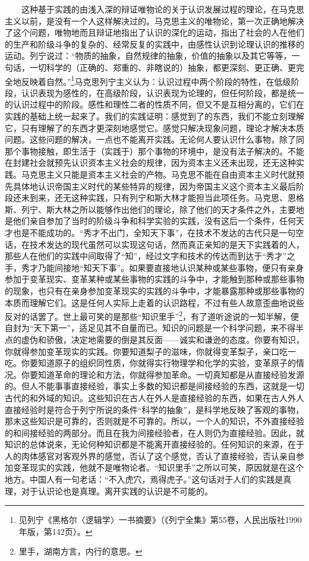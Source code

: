 \documentclass[cn,11pt,chinese]{elegantbook}
\begin{document}
　　这种基于实践的由浅入深的辩证唯物论的关于认识发展过程的理论，在马克思主义以前，是没有一个人这样解决过的。马克思主义的唯物论，第一次正确地解决了这个问题，唯物地而且辩证地指出了认识的深化的运动，指出了社会的人在他们的生产和阶级斗争的复杂的、经常反复的实践中，由感性认识到论理认识的推移的运动。列宁说过：“物质的抽象，自然规律的抽象，价值的抽象以及其它等等，一句话，一切科学的（正确的、郑重的、非瞎说的）抽象，都更深刻、更正确、更完全地反映着自然。”\footnote[3]{ 见列宁《黑格尔〈逻辑学〉一书摘要》（《列宁全集》第55卷，人民出版社1990年版，第142页）。}马克思列宁主义认为：认识过程中两个阶段的特性，在低级阶段，认识表现为感性的，在高级阶段，认识表现为论理的，但任何阶段，都是统一的认识过程中的阶段。感性和理性二者的性质不同，但又不是互相分离的，它们在实践的基础上统一起来了。我们的实践证明：感觉到了的东西，我们不能立刻理解它，只有理解了的东西才更深刻地感觉它。感觉只解决现象问题，理论才解决本质问题。这些问题的解决，一点也不能离开实践。无论何人要认识什么事物，除了同那个事物接触，即生活于（实践于）那个事物的环境中，是没有法子解决的。不能在封建社会就预先认识资本主义社会的规律，因为资本主义还未出现，还无这种实践。马克思主义只能是资本主义社会的产物。马克思不能在自由资本主义时代就预先具体地认识帝国主义时代的某些特异的规律，因为帝国主义这个资本主义最后阶段还未到来，还无这种实践，只有列宁和斯大林才能担当此项任务。马克思、恩格斯、列宁、斯大林之所以能够作出他们的理论，除了他们的天才条件之外，主要地是他们亲自参加了当时的阶级斗争和科学实验的实践，没有这后一个条件，任何天才也是不能成功的。“秀才不出门，全知天下事”，在技术不发达的古代只是一句空话，在技术发达的现代虽然可以实现这句话，然而真正亲知的是天下实践着的人，那些人在他们的实践中间取得了“知”，经过文字和技术的传达而到达于“秀才”之手，秀才乃能间接地“知天下事”。如果要直接地认识某种或某些事物，便只有亲身参加于变革现实、变革某种或某些事物的实践的斗争中，才能触到那种或那些事物的现象，也只有在亲身参加变革现实的实践的斗争中，才能暴露那种或那些事物的本质而理解它们。这是任何人实际上走着的认识路程，不过有些人故意歪曲地说些反对的话罢了。世上最可笑的是那些“知识里手”\footnote[4]{ 里手，湖南方言，内行的意思。}，有了道听途说的一知半解，便自封为“天下第一”，适足见其不自量而已。知识的问题是一个科学问题，来不得半点的虚伪和骄傲，决定地需要的倒是其反面——诚实和谦逊的态度。你要有知识，你就得参加变革现实的实践。你要知道梨子的滋味，你就得变革梨子，亲口吃一吃。你要知道原子的组织同性质，你就得实行物理学和化学的实验，变革原子的情况。你要知道革命的理论和方法，你就得参加革命。一切真知都是从直接经验发源的。但人不能事事直接经验，事实上多数的知识都是间接经验的东西，这就是一切古代的和外域的知识。这些知识在古人在外人是直接经验的东西，如果在古人外人直接经验时是符合于列宁所说的条件“科学的抽象”，是科学地反映了客观的事物，那末这些知识是可靠的，否则就是不可靠的。所以，一个人的知识，不外直接经验的和间接经验的两部分。而且在我为间接经验者，在人则仍为直接经验。因此，就知识的总体说来，无论何种知识都是不能离开直接经验的。任何知识的来源，在于人的肉体感官对客观外界的感觉，否认了这个感觉，否认了直接经验，否认亲自参加变革现实的实践，他就不是唯物论者。“知识里手”之所以可笑，原因就是在这个地方。中国人有一句老话：“不入虎穴，焉得虎子。”这句话对于人们的实践是真理，对于认识论也是真理。离开实践的认识是不可能的。\\
\end{document}
